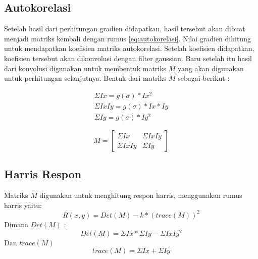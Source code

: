 \newpage
\subsection{\textbf{Autokorelasi}}
    Setelah hasil dari perhitungan gradien didapatkan, hasil tersebut akan dibuat menjadi matriks kembali dengan rumus \eqref{eq:autokorelasi}.
Nilai gradien dihitung untuk mendapatkan koefisien matriks autokorelasi. Setelah koefisien didapatkan, koefisien tersebut akan dikonvolusi dengan filter gaussian.
Baru setelah itu hasil dari konvolusi digunakan untuk membentuk matriks \(M\) yang akan digunakan untuk perhitungan selanjutnya. Bentuk dari matriks \(M\) sebagai berikut :

\begin{equation*}
    \begin{aligned}
        \Sigma Ix = g(\sigma) * Ix^2 \\
        \Sigma IxIy = g(\sigma) * Ix * Iy \\
        \Sigma Iy = g(\sigma) * Iy^2
    \end{aligned}
\end{equation*}

\begin{equation}
    M = 
    \begin{bmatrix}
        \Sigma Ix & \Sigma IxIy \\
        \Sigma IxIy & \Sigma Iy
    \end{bmatrix} 
\end{equation}

\subsection{\textbf{Harris Respon}}
    Matriks \(M\) digunakan untuk menghitung respon harris, menggunakan rumus harris yaitu:
\begin{equation}
    R(x,y) = Det(M) - k * (trace(M))^2
\end{equation}
Dimana \(Det(M)\) :
\begin{equation*}
    Det(M) = \Sigma Ix * \Sigma Iy - \Sigma IxIy^2
\end{equation*}
Dan \(trace(M)\) 
\begin{equation*}
    trace(M) = \Sigma Ix + \Sigma Iy
\end{equation*}

\newpage

